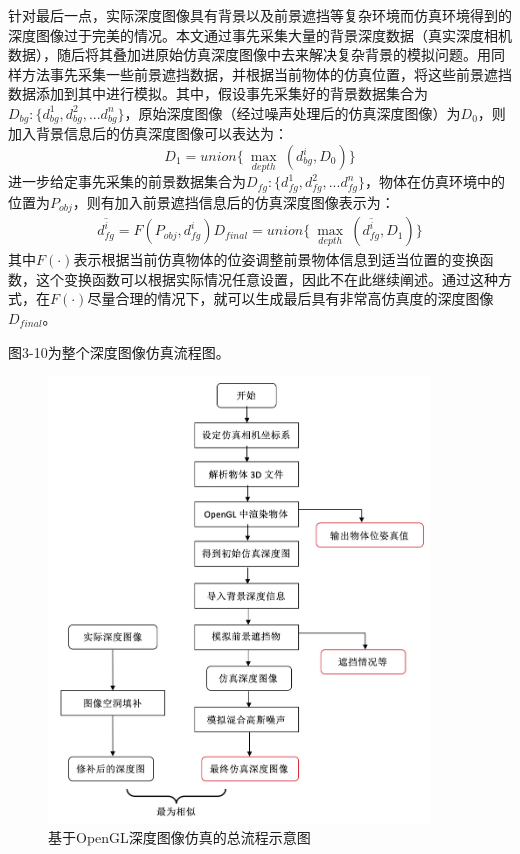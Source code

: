 针对最后一点，实际深度图像具有背景以及前景遮挡等复杂环境而仿真环境得到的深度图像过于完美的情况。本文通过事先采集大量的背景深度数据（真实深度相机数据），随后将其叠加进原始仿真深度图像中去来解决复杂背景的模拟问题。用同样方法事先采集一些前景遮挡数据，并根据当前物体的仿真位置，将这些前景遮挡数据添加到其中进行模拟。其中，假设事先采集好的背景数据集合为$D_{bg}:\{d_{bg}^1,d_{bg}^2,...d_{bg}^n\}$，原始深度图像（经过噪声处理后的仿真深度图像）为$D_0$，则加入背景信息后的仿真深度图像可以表达为：
\begin{equation}
	D_1=union\{\ \max_{depth}\ (d_{bg}^i, D_0)\}
\end{equation}
进一步给定事先采集的前景数据集合为$D_{fg}:\{d_{fg}^1,d_{fg}^2,...d_{fg}^n\}$，物体在仿真环境中的位置为$P_{obj}$，则有加入前景遮挡信息后的仿真深度图像表示为：
\begin{equation}
\begin{aligned}
	\overline{d_{fg}^i} = F(P_{obj},d_{fg}^i)
	D_{final}=union\{\ \max_{depth}\ (\overline{d_{fg}^i}, D_1)\}
\end{aligned}
\end{equation}
其中$F(\cdot)$表示根据当前仿真物体的位姿调整前景物体信息到适当位置的变换函数，这个变换函数可以根据实际情况任意设置，因此不在此继续阐述。通过这种方式，在$F(\cdot)$尽量合理的情况下，就可以生成最后具有非常高仿真度的深度图像$D_{final}$。

图3-10为整个深度图像仿真流程图。

\begin{figure}[htb]
	\centering 
	\includegraphics[width=0.9\textwidth]{./mypic/基于OpenGL深度图像仿真的总流程示意图.jpg} 
	\caption{基于OpenGL深度图像仿真的总流程示意图} 
\end{figure}

